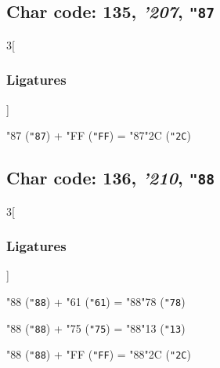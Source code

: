 \documentclass{article}
\newlength{\maxcharwidth}
\begin{document}
\subsection{Char code: 135, {\it'207}, {\tt"87}}
\label{char_135}


\begin{multicols}{3}[\subsubsection{Ligatures}]

{\testfont\char"87\noboundary} ({\tt"87}) + {\testfont\char"FF\noboundary} ({\tt"FF}) = {\testfont\char"87\noboundary}{\testfont\char"2C\noboundary} ({\tt"2C}) 

\end{multicols}

\subsection{Char code: 136, {\it'210}, {\tt"88}}
\label{char_136}


\begin{multicols}{3}[\subsubsection{Ligatures}]

{\testfont\char"88\noboundary} ({\tt"88}) + {\testfont\char"61\noboundary} ({\tt"61}) = {\testfont\char"88\noboundary}{\testfont\char"78\noboundary} ({\tt"78}) 

{\testfont\char"88\noboundary} ({\tt"88}) + {\testfont\char"75\noboundary} ({\tt"75}) = {\testfont\char"88\noboundary}{\testfont\char"13\noboundary} ({\tt"13}) 

{\testfont\char"88\noboundary} ({\tt"88}) + {\testfont\char"FF\noboundary} ({\tt"FF}) = {\testfont\char"88\noboundary}{\testfont\char"2C\noboundary} ({\tt"2C}) 

\end{multicols}
\end{document}

